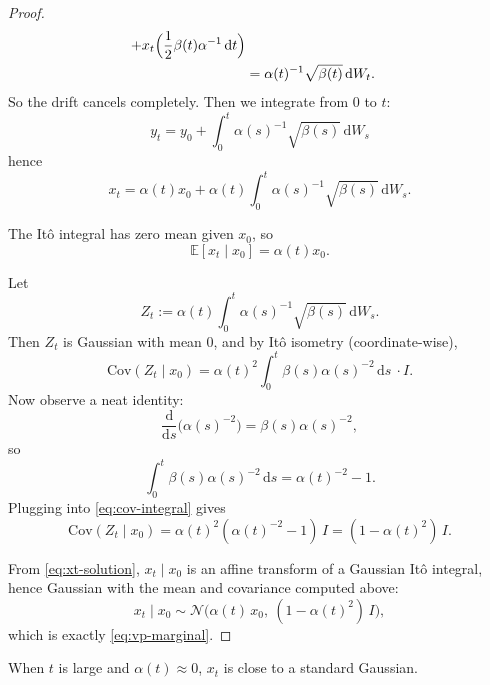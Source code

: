 \documentclass[../main]{subfiles}
\begin{document}
\begin{proof}
\begin{align}
          + x_t\Bigl(\frac12\beta(t)\alpha^{-1}\,\mathrm dt\Bigr) \\
        &= \alpha(t)^{-1}\sqrt{\beta(t)}\,\mathrm dW_t.
    \end{align}
    So the drift cancels completely. Then we integrate from $0$ to $t$:
    \begin{equation}\label{eq:yt-solution}
        y_t = y_0 + \int_0^t \alpha(s)^{-1}\sqrt{\beta(s)}\,\mathrm dW_s
    \end{equation}
    hence
    \begin{equation}\label{eq:xt-solution}
        x_t = \alpha(t) x_0 + \alpha(t)\int_0^t \alpha(s)^{-1}\sqrt{\beta(s)}\,\mathrm dW_s.
    \end{equation}

    The It\^{o} integral has zero mean given $x_0$, so
    \begin{equation}
        \mathbb E[x_t\mid x_0] = \alpha(t)x_0.
    \end{equation}
    
    Let
    \begin{equation}
        Z_t := \alpha(t)\int_0^t \alpha(s)^{-1}\sqrt{\beta(s)}\,\mathrm dW_s.
    \end{equation}
    Then $Z_t$ is Gaussian with mean $0$, and by It\^{o} isometry (coordinate-wise),
    \begin{equation}\label{eq:cov-integral}
        \mathrm{Cov}(Z_t\mid x_0)
        =
        \alpha(t)^2\int_0^t \beta(s)\alpha(s)^{-2}\,\mathrm ds\ \cdot I.
    \end{equation}
    Now observe a neat identity:
    \begin{equation}
        \frac{\mathrm d}{\mathrm ds}\bigl(\alpha(s)^{-2}\bigr)
        = \beta(s)\alpha(s)^{-2},
    \end{equation}
    so
    \begin{equation}
        \int_0^t \beta(s)\alpha(s)^{-2}\,\mathrm ds
        = \alpha(t)^{-2}-1.
    \end{equation}
    Plugging into \eqref{eq:cov-integral} gives
    \begin{equation}
        \mathrm{Cov}(Z_t\mid x_0)
        = \alpha(t)^2(\alpha(t)^{-2}-1)\,I
        = (1-\alpha(t)^2)\,I.
    \end{equation}
    
    From \eqref{eq:xt-solution}, $x_t\mid x_0$ is an affine transform of a Gaussian It\^{o} integral,
    hence Gaussian with the mean and covariance computed above:
    \begin{equation}
        x_t \mid x_0 \sim \mathcal N\!\bigl(\alpha(t)\,x_0,\ (1-\alpha(t)^2)\,I\bigr),
    \end{equation}
    which is exactly \eqref{eq:vp-marginal}.
\end{proof}
When $t$ is large and $\alpha(t)\approx 0$, $x_t$ is close to a standard Gaussian.
\end{document}
